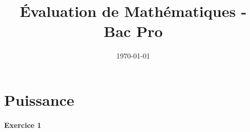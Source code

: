 \documentclass[a4paper]{article}
\begin{document}
  \title{Évaluation de Mathématiques - Bac Pro}
  \author{}
  \date{\today}
  \maketitle
  
  \section{Puissance}
  \paragraph{Exercice 1}
\end{document}
